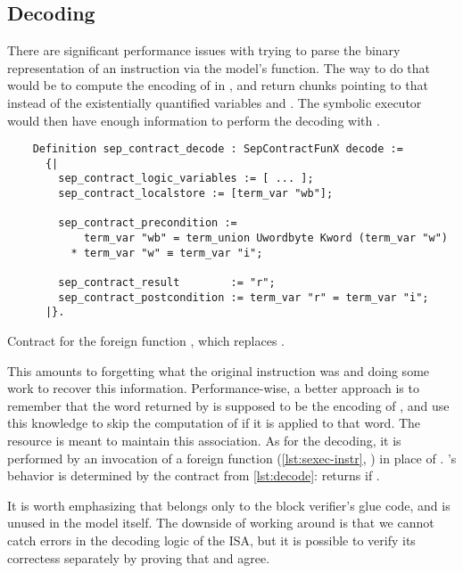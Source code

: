 \subsection{Decoding}
\label{sec:block-verifier-decode}

There are significant performance issues with trying to parse the binary representation of an instruction
via the model's  function. The way to do that would be to compute the encoding of  in , and return  chunks pointing to that instead of the existentially quantified variables  and . The symbolic executor would then have enough information to perform the decoding with .

\begin{listing}[b]
  \begin{verbatim}
    Definition sep_contract_decode : SepContractFunX decode :=
      {|
        sep_contract_logic_variables := [ ... ];
        sep_contract_localstore := [term_var "wb"];

        sep_contract_precondition :=
            term_var "wb" = term_union Uwordbyte Kword (term_var "w")
          * term_var "w" ≡ term_var "i";

        sep_contract_result        := "r";
        sep_contract_postcondition := term_var "r" = term_var "i";
      |}.
  \end{verbatim}
  \caption{Contract for the foreign function , which replaces .}
  \label{lst:decode}
\end{listing}

This amounts to forgetting what the original instruction was and doing some work to recover this information. Performance-wise, a better approach is to remember that the word returned by  is supposed to be the encoding of , and use this knowledge to skip the computation of  if it is applied to that word. The  resource is meant to maintain this association. As for the decoding, it is performed by an invocation of a foreign function  (\cref{lst:sexec-instr}, ) in place of . 's behavior is determined by the contract from \cref{lst:decode}:  returns  if .

It is worth emphasizing that  belongs only to the block verifier's glue code, and is unused in the model itself. The downside of working around  is that we cannot catch errors in the decoding logic of the ISA, but it is possible to verify its correctess separately by proving that  and  agree.

